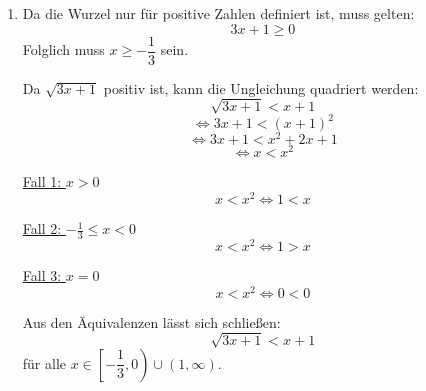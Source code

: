 \documentclass[a4paper,12pt]{article}
\begin{document}
\begin{enumerate}[label=\alph*)]
    Da $-3 < x < -1$, ist der Nenner negativ, weil $(x+1)$ negativ, aber $(x+3)$ positiv ist.

    Vereinfachung der Ungleichung:
    \[
        \frac{2(x^2+2x-1)}{(x+1)(x+3)} < 2
    \]
    \[
        \iff \frac{x^2+2x-1}{(x+1)(x+3)} < 1
    \]
    \[
        \iff x^2+2x-1 > (x+1)(x+3) = x^2+4x+3
    \]
    \[
        \iff -2x > 4
    \]
    \[
        \iff x < -2
    \]

    Demnach muss $x$ in Fall 3 kleiner als $-2$ sein.

    Insgesamt gilt die Ungleichung
    \[
        \frac{1-\frac{1}{x}}{1+\frac{1}{x}} + \frac{1-\frac{1}{x+2}}{1+\frac{1}{x+2}} < 2
    \]
    für alle $x \in (-3, -2) \cup (-1, \infty)$.

    \item
    Da die Wurzel nur für positive Zahlen definiert ist, muss gelten:
    \[
        3x + 1 \geq 0
    \]
    Folglich muss $x \geq -\dfrac{1}{3}$ sein.

    Da $\sqrt{3x+1}$ positiv ist, kann die Ungleichung quadriert werden:
    \[
        \sqrt{3x+1} < x+1
    \]
    \[
        \iff 3x+1 < (x+1)^2
    \]
    \[
        \iff 3x+1 < x^2+2x+1
    \]
    \[
        \iff x < x^2
    \]

    \underline{Fall 1: $x > 0$}
    \[
        x < x^2 \iff 1 < x
    \]

    \underline{Fall 2: $-\frac{1}{3} \leq x < 0$}
    \[
        x < x^2 \iff 1 > x
    \]

    \underline{Fall 3: $x = 0$}
    \[
        x < x^2 \iff 0 < 0
    \]

    Aus den Äquivalenzen lässt sich schließen:
    \[
        \sqrt{3x+1} < x+1
    \]
    für alle $x \in \left[-\dfrac{1}{3}, 0\right) \cup (1, \infty)$.

\end{enumerate}
\end{document}
